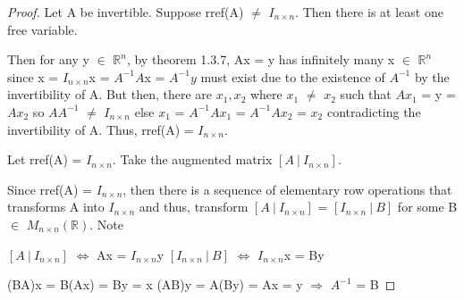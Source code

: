     \begin{proof}
        Let A be invertible. Suppose rref(A) $\not =$ $I_{n \times n}$.
        Then there is at least one free variable.

        Then for any y $\in$ $\mathbb{R}^n$,
        by {\color{red} theorem 1.3.7}, Ax = y
        has infinitely many x $\in$ $\mathbb{R}^n$
        since x = $I_{n \times n}$x = $A^{-1}A$x = $A^{-1}y$
        must exist due to the existence of $A^{-1}$ by the invertibility of A.
        But then, there are $x_1,x_2$ where $x_1$ $\not =$ $x_2$
        such that $Ax_1$ = y = $Ax_2$ so $AA^{-1}$ $\not =$ $I_{n \times n}$
        else $x_1$ = $A^{-1}Ax_1$ = $A^{-1}Ax_2$ = $x_2$
        contradicting the invertibility of A.
        Thus, rref(A) = $I_{n \times n}$.

        \vspace{0.2cm}

        Let rref(A) = $I_{n \times n}$.    
        Take the augmented matrix $[A \ | \ I_{n \times n}]$.

        Since rref(A) = $I_{n \times n}$,
        then there is a sequence of elementary row operations
        that transforms A into $I_{n \times n}$ and thus,
        transform $[A \ | \ I_{n \times n}]$ = $[I_{n \times n} \ | \ B]$
        for some B $\in$ $M_{n \times n}(\mathbb{R})$. Note

        \hspace{0.5cm}
        $[A \ | \ I_{n \times n}]$
        \hspace{0.5cm}
        $\Leftrightarrow$
        \hspace{0.5cm}
        Ax = $I_{n \times n}$y
        \hspace{1cm}
        $[I_{n \times n} \ | \ B]$
        \hspace{0.5cm}
        $\Leftrightarrow$
        \hspace{0.5cm}
        $I_{n \times n}$x = By

        \hspace{0.5cm}
        (BA)x = B(Ax)
        = By = x
        \hspace{1cm}
        (AB)y = A(By)
        = Ax = y
        \hspace{0.5cm}
        $\Rightarrow$
        \hspace{0.5cm}
        $A^{-1}$ = B
    \end{proof}

    \vspace{0.5cm}



